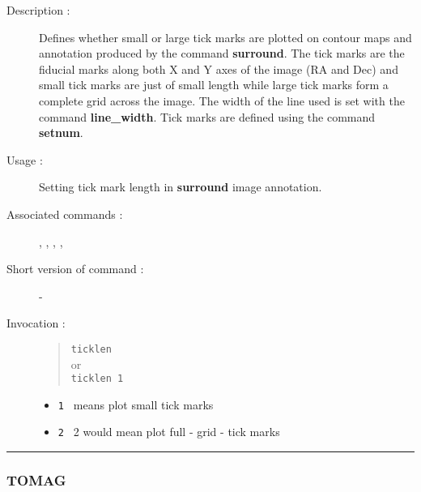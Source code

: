 \begin{description}

\item[Description :] Defines whether small or large tick marks are
plotted on contour maps and annotation produced by the command {\bf
surround}.  The tick marks are the fiducial marks along both X and Y
axes of the image (RA and Dec) and small tick marks are just of small
length while large tick marks form a complete grid across the image.
The width of the line used is set with the command {\bf line\_width}.
Tick marks are defined using the command {\bf setnum}.

\item[Usage :] Setting tick mark length in {\bf surround} image annotation.

\item[Associated commands :] {\tt {}}, 
{\tt {}}, {\tt {}}, 
{\tt {}}, {\tt {}}

\item[Short version of command :] -
\item[Invocation :]

\begin{quote}{\tt  ticklen }\\
or \\
{\tt ticklen 1 }
\end{quote}

\begin{itemize}

\item {\tt 1 } means plot small tick marks
\item {\tt 2 } 2 would mean plot full - grid - tick marks
\end{itemize}

\end{description}

\hrule 
\subsubsection*{\label{TOMAG}TOMAG}

